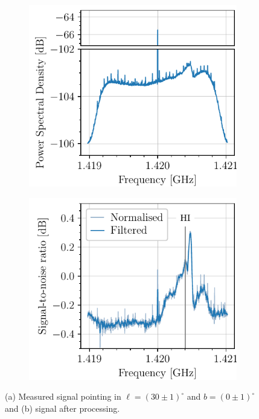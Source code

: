 \begin{figure}
    \begin{subfigure}{0.49\textwidth}
        \centering
        \includegraphics[scale=1]{figures/raw_signal.pdf}
        \caption{}
        \label{fig:raw_signal}
    \end{subfigure}
    \begin{subfigure}{0.49\textwidth}
        \centering
        \includegraphics[scale=1]{figures/clean_signal.pdf}
        \caption{}
        \label{fig:clean_signal}
    \end{subfigure}
    \caption{(a) Measured signal pointing in $\ell = (30 \pm 1)^{\circ}$ and $b = (0 \pm 1)^{\circ}$ and (b) signal after processing.}
    \label{fig:process_example}
\end{figure}


